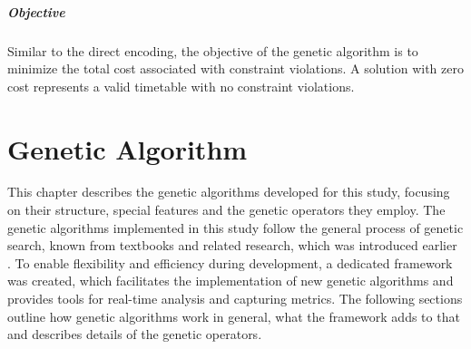 \documentclass[english,examples]{isasthesis}
\begin{document}
\paragraph{Objective}
Similar to the direct encoding, the objective of the genetic algorithm
is to minimize the total cost associated with constraint violations. A solution
with zero cost represents a valid timetable with no constraint violations.

\begin{minipage}{\textwidth}
    \begin{Example}
        \begin{minipage}{\textwidth}
            \centering
            
            \label{ex:heuristic_example}
        \end{minipage}
    \end{Example}
\end{minipage}



\chapter{Genetic Algorithm}
This chapter describes the genetic algorithms developed for this study, focusing
on their structure, special features and the genetic operators they employ.
The genetic algorithms implemented in this study follow the general process
of genetic search, known from textbooks and related research, which was
introduced earlier \cite{goldberg1989}.
%
To enable flexibility and efficiency during development, a dedicated framework
was created, which facilitates the implementation of new genetic algorithms
and provides tools for real-time analysis and capturing metrics. The following
sections outline how genetic algorithms work in general, what the framework
adds to that and describes details of the genetic operators.


\end{document}
